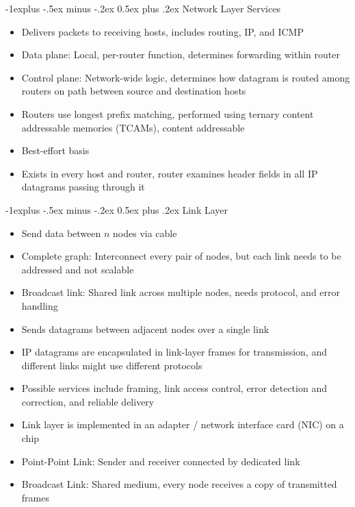 \documentclass[10pt, landscape]{article}
\makeatletter
\renewcommand{\section}{\@startsection{section}{1}{0mm}%
                                {-1ex plus -.5ex minus -.2ex}%
                                {0.5ex plus .2ex}%
                                {\normalfont\large\bfseries}}
\renewcommand{\section}{\@startsection{section}{2}{0mm}%
                                {-1explus -.5ex minus -.2ex}%
                                {0.5ex plus .2ex}%
                                {\normalfont\normalsize\bfseries}}
\makeatother
\begin{document}
\begin{multicols*}{3}
\section{Network Layer Services}
\begin{itemize}
    \item Delivers packets to receiving hosts, includes routing, IP, and ICMP
    \item Data plane: Local, per-router function, determines forwarding within router
    \item Control plane: Network-wide logic, determines how datagram is routed among routers on path between source and destination hosts
    \item Routers use longest prefix matching, performed using ternary content addressable memories (TCAMs), content addressable
    \item Best-effort basis
    \item Exists in every host and router, router examines header fields in all IP datagrams passing through it
\end{itemize}

\section{Link Layer}
\begin{itemize}
    \item Send data between $n$ nodes via cable
    \item Complete graph: Interconnect every pair of nodes, but each link needs to be addressed and not scalable
    \item Broadcast link: Shared link across multiple nodes, needs protocol, and error handling
    \item Sends datagrams between adjacent nodes over a single link
    \item IP datagrams are encapsulated in link-layer frames for transmission, and different links might use different protocols
    \item Possible services include framing, link access control, error detection and correction, and reliable delivery
    \item Link layer is implemented in an adapter / network interface card (NIC) on a chip
    \item Point-Point Link: Sender and receiver connected by dedicated link
    \item Broadcast Link: Shared medium, every node receives a copy of transmitted frames
\end{itemize}


\end{multicols*}
\end{document}
